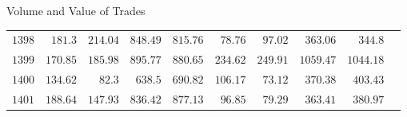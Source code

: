 \documentclass{beamer}
\begin{document}
\begin{frame}{Volume and Value of Trades}
\begin{tabular}{lrrrrrrrrr}
        \(\mathrm{1398}\)           & \(\mathrm{181.3}\)                               & \(\mathrm{214.04}\)                                    & \(\mathrm{848.49}\)                            & \(\mathrm{815.76}\)                         & \(\mathrm{78.76}\)  & \(\mathrm{97.02}\)  & \(\mathrm{363.06}\)  & \(\mathrm{344.8}\)   \\
        \(\mathrm{1399}\)           & \(\mathrm{170.85}\)                              & \(\mathrm{185.98}\)                                    & \(\mathrm{895.77}\)                            & \(\mathrm{880.65}\)                         & \(\mathrm{234.62}\) & \(\mathrm{249.91}\) & \(\mathrm{1059.47}\) & \(\mathrm{1044.18}\) \\
        \(\mathrm{1400}\)           & \(\mathrm{134.62}\)                              & \(\mathrm{82.3}\)                                      & \(\mathrm{638.5}\)                             & \(\mathrm{690.82}\)                         & \(\mathrm{106.17}\) & \(\mathrm{73.12}\)  & \(\mathrm{370.38}\)  & \(\mathrm{403.43}\)  \\
        \(\mathrm{1401}\)           & \(\mathrm{188.64}\)                              & \(\mathrm{147.93}\)                                    & \(\mathrm{836.42}\)                            & \(\mathrm{877.13}\)                         & \(\mathrm{96.85}\)  & \(\mathrm{79.29}\)  & \(\mathrm{363.41}\)  & \(\mathrm{380.97}\)  \\
        \bottomrule
    \end{tabular}
\end{frame}
\end{document}
